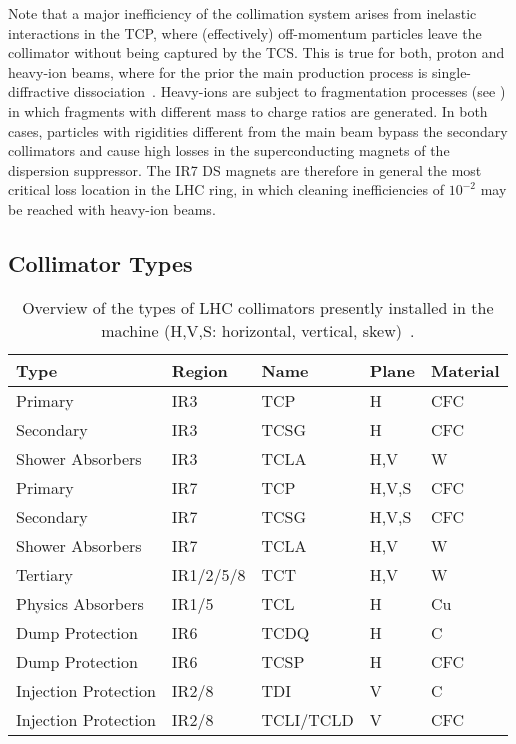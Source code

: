 Note that a major inefficiency of the collimation system arises from inelastic interactions in the TCP, where (effectively) off-momentum particles leave the collimator without being captured by the TCS. This is true for both, proton and heavy-ion beams, where for the prior the main production process is single-diffractive dissociation~\cite{ipac10:TUPEB080}. Heavy-ions are subject to fragmentation processes (see ) in which fragments with different mass to charge ratios are generated. In both cases, particles with rigidities different from the main beam bypass the secondary collimators and cause high losses in the superconducting magnets of the dispersion suppressor. The IR7 DS magnets are therefore in general the most critical loss location in the LHC ring, in which cleaning inefficiencies of $10^{-2}$ may be reached with heavy-ion beams.


\subsection{Collimator Types} \label{chap:collimator_types}
%
\begin{table}[htbp]
\centering
\caption{Overview of the types of LHC collimators presently installed in the machine (H,V,S: horizontal, vertical, skew)~\citedr.}
\label{tab:ctypes}
\small
\begin{tabular}{lllll}
Type                 & Region    & Name      & Plane & Material \\ \toprule
Primary              & IR3       & TCP       & H     & CFC      \\
Secondary            & IR3       & TCSG      & H     & CFC      \\
Shower Absorbers     & IR3       & TCLA      & H,V   & W        \\ \midrule
Primary              & IR7       & TCP       & H,V,S & CFC      \\
Secondary            & IR7       & TCSG      & H,V,S & CFC      \\
Shower Absorbers     & IR7       & TCLA      & H,V   & W        \\ \midrule
Tertiary             & IR1/2/5/8 & TCT       & H,V   & W        \\
Physics Absorbers    & IR1/5     & TCL       & H     & Cu       \\ \midrule
Dump Protection      & IR6       & TCDQ      & H     & C        \\
Dump Protection      & IR6       & TCSP      & H     & CFC      \\ \midrule
Injection Protection & IR2/8     & TDI       & V     & C        \\
Injection Protection & IR2/8     & TCLI/TCLD & V     & CFC      \\ \bottomrule
\end{tabular}
\end{table}

